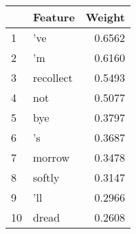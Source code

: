 \begin{tabular}{llr}
\toprule
{} &    Feature &  Weight \\
\midrule
1  &        've &  0.6562 \\
2  &         'm &  0.6160 \\
3  &  recollect &  0.5493 \\
4  &        not &  0.5077 \\
5  &        bye &  0.3797 \\
6  &         's &  0.3687 \\
7  &     morrow &  0.3478 \\
8  &     softly &  0.3147 \\
9  &        'll &  0.2966 \\
10 &      dread &  0.2608 \\
\bottomrule
\end{tabular}
